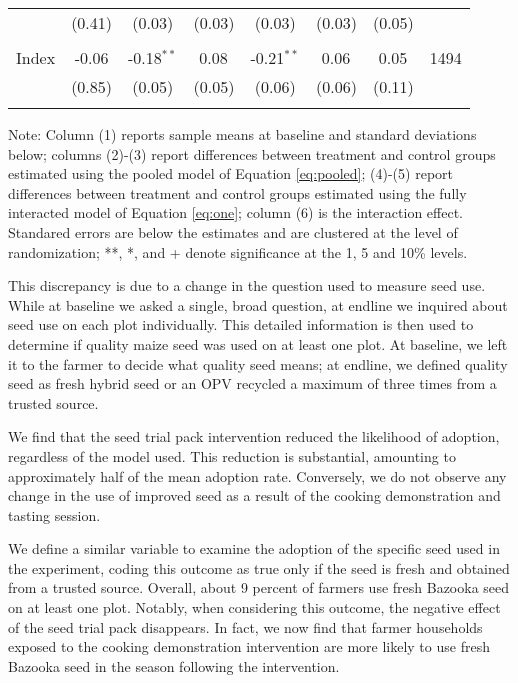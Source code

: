 \documentclass[english]{article}\usepackage[]{graphicx}\usepackage[]{xcolor}
\begin{document}
\begin{sidewaystable}
\begin{center}
\begin{tabular}{rccccccc}
& (0.41) & (0.03)  & (0.03) & (0.03)  & (0.03)  & (0.05)
 \\
\\
Index
& -0.06
& -0.18$^{**}$
& 0.08$^{}$ 
& -0.21$^{**}$ 
& 0.06$^{}$
& 0.05$^{}$ & 1494 \\

& (0.85) & (0.05)  & (0.05) & (0.06)  & (0.06)  & (0.11)
 \\

\\


\hline\hline
\end{tabular}
\end{center}
\scriptsize
Note: Column (1) reports sample means at baseline and standard deviations below;  columns (2)-(3) report differences between treatment and control groups estimated using the pooled model of Equation  \ref{eq:pooled}; (4)-(5) report differences between treatment and control groups estimated using the fully interacted model of Equation \ref{eq:one}; column (6) is the interaction effect. Standared errors are below the estimates and are clustered at the level of randomization; **, *, and + denote significance at the 1, 5 and 10\% levels.
\end{sidewaystable}

This discrepancy is due to a change in the question used to measure
seed use. While at baseline we asked a single, broad question, at
endline we inquired about seed use on each plot individually. This
detailed information is then used to determine if quality maize seed
was used on at least one plot. At baseline, we left it to the farmer
to decide what quality seed means; at endline, we defined quality
seed as fresh hybrid seed or an OPV recycled a maximum of three times
from a trusted source.

We find that the seed trial pack intervention reduced the likelihood
of adoption, regardless of the model used. This reduction is substantial,
amounting to approximately half of the mean adoption rate. Conversely,
we do not observe any change in the use of improved seed as a result
of the cooking demonstration and tasting session.

We define a similar variable to examine the adoption of the specific
seed used in the experiment, coding this outcome as true only if the
seed is fresh and obtained from a trusted source. Overall, about 9
percent of farmers use fresh Bazooka seed on at least one plot. Notably,
when considering this outcome, the negative effect of the seed trial
pack disappears. In fact, we now find that farmer households exposed
to the cooking demonstration intervention are more likely to use fresh
Bazooka seed in the season following the intervention.
\end{document}
